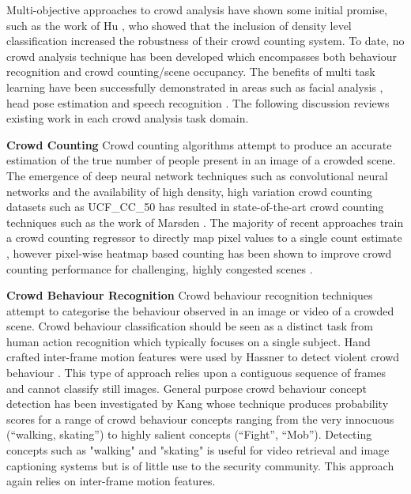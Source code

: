 \documentclass[10pt,twocolumn,letterpaper]{article}
\begin{document}
Multi-objective approaches to crowd analysis have shown some initial promise, such as the work of Hu \etal \cite{hu2016dense}, who showed that the inclusion of density level classification increased the robustness of their crowd counting system. To date, no crowd analysis technique has been developed which encompasses both behaviour recognition and crowd counting/scene occupancy. The benefits of multi task learning have been successfully demonstrated in areas such as facial analysis \cite{Ranjan2016}, head pose estimation \cite{yan2016multi} and speech recognition \cite{seltzer2013multi}. The following discussion reviews existing work in each crowd analysis task domain. 

\textbf{Crowd Counting} Crowd counting algorithms attempt to produce an accurate estimation of the true number of people present in an image of a crowded scene. The emergence of deep neural network techniques such as convolutional neural networks and the availability of high density, high variation crowd counting datasets such as UCF\_CC\_50 \cite{idrees2013multi} has resulted in state-of-the-art crowd counting techniques such as the work of Marsden \etal \cite{mark_count}. The majority of recent approaches train a crowd counting regressor to directly map pixel values to a single count estimate \cite{Zhang2015,Hu2016}, however pixel-wise heatmap based counting  has been shown to improve crowd counting performance for challenging, highly congested scenes \cite{zhang2016single}.

\textbf{Crowd Behaviour Recognition} 
Crowd behaviour recognition techniques attempt to categorise the behaviour observed in an image or video of a crowded scene. Crowd behaviour classification should be seen as a distinct task from human action recognition which typically focuses on a single subject. Hand crafted  inter-frame motion features were used by Hassner \etal to detect violent crowd behaviour \cite{Hassner2012}. This type of approach relies upon a contiguous sequence of frames and cannot classify still images. 
General purpose crowd behaviour concept detection has been investigated  by Kang \etal \cite{Kang2015} whose technique produces probability scores for a range of crowd behaviour concepts ranging from the very innocuous (``walking, skating'') to highly salient concepts (``Fight'', ``Mob''). Detecting concepts such as "walking" and "skating" is useful for video retrieval and image captioning systems but is of little use to the security community. This approach again relies on inter-frame motion features. 
\end{document}
